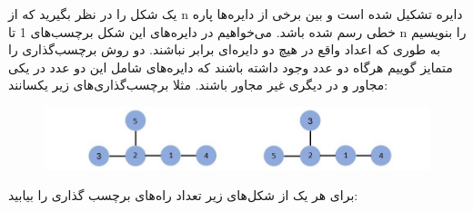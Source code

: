 \p
یک شکل را در نظر بگیرید که از n دایره تشکیل شده است و بین برخی از دایره‌ها پاره خطی رسم شده باشد. می‌خواهیم در دایره‌های این شکل برچسب‌های 1 تا n را بنویسیم 
به طوری که اعداد واقع در هیچ دو دایره‌ای برابر نباشند. دو روش برچسب‌گذاری را متمایز گوییم هرگاه دو عدد وجود داشته باشند که دایره‌های شامل این دو عدد در یکی مجاور و در دیگری غیر مجاور باشند.
مثلا برچسب‌گذاری‌های زیر یکسانند:

\begin{figure}[h]
\centering
\includegraphics[scale = 0.3]{./0.jpg}

\end{figure}

برای هر یک از شکل‌های زیر تعداد راه‌های برچسب گذاری را بیابید:


